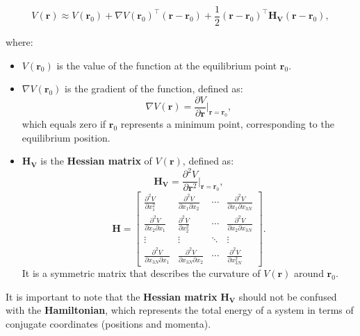 \documentclass[English, Lau, oneside]{sapthesis}
\begin{document}
\begin{equation}
V(\mathbf{r}) \approx V(\mathbf{r}_0) + \nabla V(\mathbf{r}_0)^\top (\mathbf{r} - \mathbf{r}_0) + \frac{1}{2} (\mathbf{r} - \mathbf{r}_0)^\top \mathbf{H_V} (\mathbf{r} - \mathbf{r}_0),\label{hessian}
\end{equation}

where:
\begin{itemize}
    \item \( V(\mathbf{r}_0) \) is the value of the function at the equilibrium point \( \mathbf{r}_0 \).
    \item \( \nabla V(\mathbf{r}_0) \) is the gradient of the function, defined as:
    \begin{equation}
    \nabla V(\mathbf{r}) = \frac{\partial V}{\partial \mathbf{r}} \bigg|_{\mathbf{r} = \mathbf{r}_0},
    \end{equation}
    which equals zero if \( \mathbf{r}_0 \) represents a minimum point, corresponding to the equilibrium position.
    \item \( \mathbf{H_V} \) is the \textbf{Hessian matrix} of \( V(\mathbf{r}) \), defined as:
    \begin{equation}
    \mathbf{H_V} = \frac{\partial^2 V}{\partial \mathbf{r}^2} \bigg|_{\mathbf{r} = \mathbf{r}_0},
    \end{equation}
    \[
    \mathbf{H} = \begin{bmatrix}
    \frac{\partial^2 V}{\partial x_1^2} & \frac{\partial^2 V}{\partial x_1 \partial x_2} & \cdots & \frac{\partial^2 V}{\partial x_1 \partial x_{3N}} \\
    \frac{\partial^2 V}{\partial x_2 \partial x_1} & \frac{\partial^2 V}{\partial x_2^2} & \cdots & \frac{\partial^2 V}{\partial x_2 \partial x_{3N}} \\
    \vdots & \vdots & \ddots & \vdots \\
    \frac{\partial^2 V}{\partial x_{3N} \partial x_1} & \frac{\partial^2 V}{\partial x_{3N} \partial x_2} & \cdots & \frac{\partial^2 V}{\partial x_{3N}^2}
    \end{bmatrix}.
    \]
    It is a symmetric matrix that describes the curvature of \( V(\mathbf{r}) \) around \( \mathbf{r}_0 \).
\end{itemize}

It is important to note that the \textbf{Hessian matrix} \( \mathbf{H_V} \) should not be confused with the \textbf{Hamiltonian}, which represents the total energy of a system in terms of conjugate coordinates (positions and momenta).  
\end{document}
